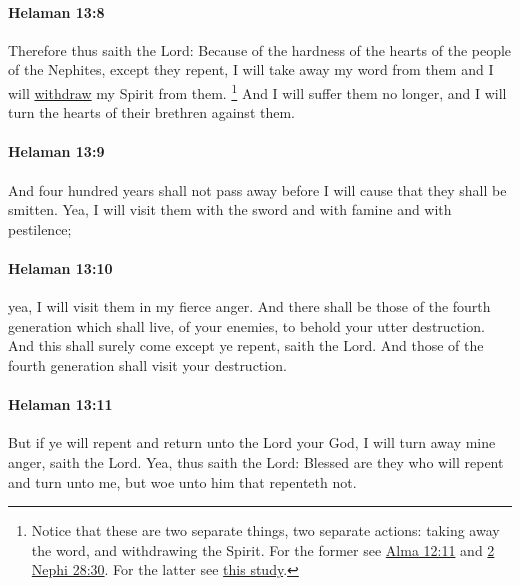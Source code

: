 		\paragraph{Helaman 13:8} %
			\label{HELAMAN-13-8}

			Therefore thus saith the Lord:
			Because of the hardness of the hearts of the people of the Nephites,
			except they repent,
			I will take away my word from them
			and I will \hyperref[WITHDRAW]{withdraw} my Spirit from them.
				\footnote{%
					Notice that these are two separate things, two separate actions: taking away the word, and withdrawing the Spirit. For the former see \hyperref[ALMA-12-11]{Alma 12:11} and \hyperref[2NEPHI-28-30]{2 Nephi 28:30}. For the latter see \hyperref[WITHDRAW-spirit]{this study}.
					}
			And I will suffer them no longer,
			and I will turn the hearts of their brethren against them.

		\paragraph{Helaman 13:9} %
			\label{HELAMAN-13-9}

			And four hundred years shall not pass away
			before I will cause that they shall be smitten.
			Yea, I will visit them with the sword and with famine and with pestilence;

		\paragraph{Helaman 13:10} %
			\label{HELAMAN-13-10}

			yea, I will visit them in my fierce anger.
			And there shall be those of the fourth generation
			which shall live, of your enemies,
			to behold your utter destruction.
			And this shall surely come except ye repent, saith the Lord.
			And those of the fourth generation shall visit your destruction.

		\paragraph{Helaman 13:11} %
			\label{HELAMAN-13-11}

			But if ye will repent and return unto the Lord your God,
			I will turn away mine anger, saith the Lord.
			Yea, thus saith the Lord:
			Blessed are they who will repent and turn unto me,
			but woe unto him that repenteth not.

